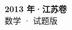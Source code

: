 \documentclass[zihao=-4, a4paper]{ctexart}
\begin{document}
\begin{center}
  {\Large\bfseries 2013 年·江苏卷}\\[4pt]
  {\large 数学 · 试题版}
\end{center}
\medskip
{}

\end{document}
